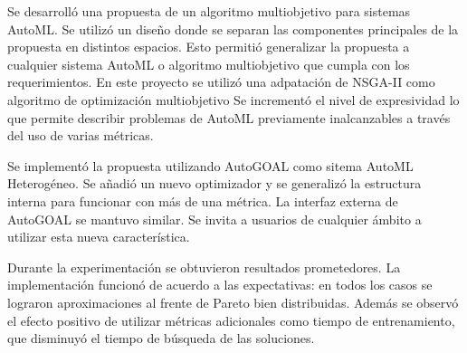 \begin{conclusions}
    Se desarroll\'o una propuesta de un algoritmo multiobjetivo para sistemas AutoML. Se utiliz\'o un dise\~no donde se separan las componentes principales de la propuesta en distintos espacios. Esto permiti\'o generalizar la propuesta a cualquier sistema AutoML o algoritmo multiobjetivo que cumpla con los requerimientos. En este proyecto se utiliz\'o una adpataci\'on de NSGA-II  como algoritmo de optimizaci\'on multiobjetivo
    Se increment\'o el nivel de expresividad lo que permite describir problemas de AutoML previamente inalcanzables a trav\'es del uso de varias m\'etricas. 


    Se implement\'o la propuesta utilizando AutoGOAL  como sitema AutoML Heterog\'eneo. Se a\~nadi\'o un nuevo optimizador y se generaliz\'o la estructura interna para funcionar con m\'as de una m\'etrica. La interfaz externa de AutoGOAL se mantuvo similar. Se invita a usuarios de cualquier \'ambito a utilizar esta nueva caracter\'istica.

    Durante la experimentaci\'on se obtuvieron resultados prometedores. La implementaci\'on funcion\'o de acuerdo a las expectativas: en todos los casos se lograron aproximaciones al frente de Pareto bien distribuidas. Adem\'as se observ\'o el efecto positivo de utilizar m\'etricas adicionales como tiempo de entrenamiento, que disminuy\'o el tiempo de b\'usqueda de las soluciones.




\end{conclusions}
